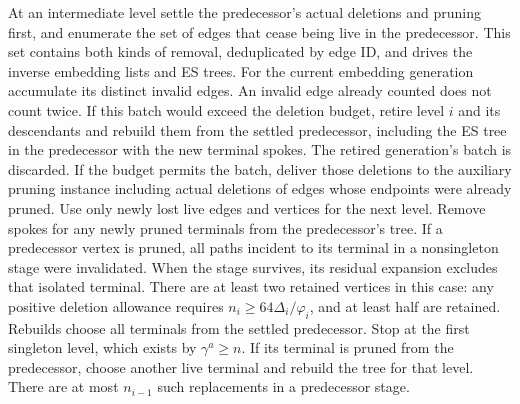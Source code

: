 \documentclass[11pt]{article}
\begin{document}
\begin{itemize}
  At an intermediate level settle the predecessor's actual deletions and pruning first, and enumerate the set of edges that cease being live in the predecessor. This set contains both kinds of removal, deduplicated by edge ID, and drives the inverse embedding lists and ES trees. For the current embedding generation accumulate its distinct invalid edges. An invalid edge already counted does not count twice. If this batch would exceed the deletion budget, retire level \(i\) and its descendants and rebuild them from the settled predecessor, including the ES tree in the predecessor with the new terminal spokes. The retired generation's batch is discarded. If the budget permits the batch, deliver those deletions to the auxiliary pruning instance including actual deletions of edges whose endpoints were already pruned. Use only newly lost live edges and vertices for the next level. Remove spokes for any newly pruned terminals from the predecessor's tree. If a predecessor vertex is pruned, all paths incident to its terminal in a nonsingleton stage were invalidated. When the stage survives, its residual expansion excludes that isolated terminal. There are at least two retained vertices in this case: any positive deletion allowance requires \(n_i\ge64\Delta_i/\varphi_i\), and at least half are retained. Rebuilds choose all terminals from the settled predecessor. Stop at the first singleton level, which exists by \(\gamma^a\ge n\). If its terminal is pruned from the predecessor, choose another live terminal and rebuild the tree for that level. There are at most \(n_{i-1}\) such replacements in a predecessor stage.


\end{itemize}
\end{document}
